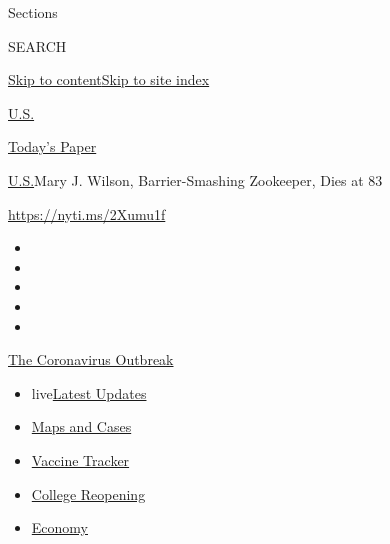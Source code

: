 Sections

SEARCH

\protect\hyperlink{site-content}{Skip to
content}\protect\hyperlink{site-index}{Skip to site index}

\href{https://www.nytimes.com/section/us}{U.S.}

\href{https://myaccount.nytimes.com/auth/login?response_type=cookie\&client_id=vi}{}

\href{https://www.nytimes.com/section/todayspaper}{Today's Paper}

\href{/section/us}{U.S.}\textbar{}Mary J. Wilson, Barrier-Smashing
Zookeeper, Dies at 83

\url{https://nyti.ms/2Xumu1f}

\begin{itemize}
\item
\item
\item
\item
\item
\end{itemize}

\href{https://www.nytimes.com/news-event/coronavirus?action=click\&pgtype=Article\&state=default\&region=TOP_BANNER\&context=storylines_menu}{The
Coronavirus Outbreak}

\begin{itemize}
\tightlist
\item
  live\href{https://www.nytimes.com/2020/08/03/world/coronavirus-covid-19.html?action=click\&pgtype=Article\&state=default\&region=TOP_BANNER\&context=storylines_menu}{Latest
  Updates}
\item
  \href{https://www.nytimes.com/interactive/2020/us/coronavirus-us-cases.html?action=click\&pgtype=Article\&state=default\&region=TOP_BANNER\&context=storylines_menu}{Maps
  and Cases}
\item
  \href{https://www.nytimes.com/interactive/2020/science/coronavirus-vaccine-tracker.html?action=click\&pgtype=Article\&state=default\&region=TOP_BANNER\&context=storylines_menu}{Vaccine
  Tracker}
\item
  \href{https://www.nytimes.com/2020/08/02/us/covid-college-reopening.html?action=click\&pgtype=Article\&state=default\&region=TOP_BANNER\&context=storylines_menu}{College
  Reopening}
\item
  \href{https://www.nytimes.com/live/2020/08/03/business/stock-market-today-coronavirus?action=click\&pgtype=Article\&state=default\&region=TOP_BANNER\&context=storylines_menu}{Economy}
\end{itemize}

